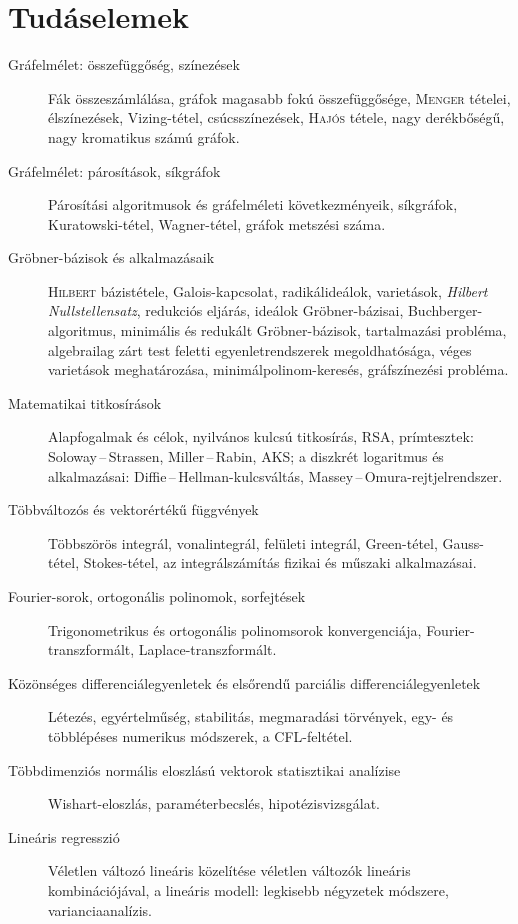 \documentclass[DIV=15,appendixprefix]{scrreprt}
\theoremstyle{definition}
\theoremstyle{remark}
\begin{document}
\chapter{Tudáselemek}
%
\begin{description}
	\item[Gráfelmélet: összefüggőség, színezések] Fák összeszámlálása, gráfok magasabb fokú
	összefüggősége, \textsc{Menger} tételei, élszínezések, Vizing-tétel, csúcsszínezések,
	\textsc{Hajós} tétele, nagy derékbőségű, nagy kromatikus számú gráfok.
%
	\item[Gráfelmélet: párosítások, síkgráfok] Párosítási algoritmusok és gráfelméleti
	következményeik, síkgráfok, Kuratowski-tétel, Wagner-tétel, gráfok metszési száma.
%
	\item[Gröbner-bázisok és alkalmazásaik] \textsc{Hilbert} bázistétele, Galois-kapcsolat,
	radikálideálok, varietások, \emph{Hilbert Nullstellensatz}, redukciós eljárás, ideálok
	Gröbner-bázisai, Buchberger-algoritmus, minimális és redukált Gröbner-bázisok, tartalmazási
	probléma, algebrailag zárt test feletti egyenletrendszerek megoldhatósága, véges varietások
	meghatározása, minimálpolinom-keresés, gráfszínezési probléma.
%
	\item[Matematikai titkosírások] Alapfogalmak és célok, nyilvános kulcsú titkosírás, RSA,
	prímtesztek: Soloway\,--\,Strassen, Miller\,--\,Rabin, AKS; a diszkrét logaritmus és
	alkalmazásai: Diffie\,--\,Hellman-kulcsváltás, Massey\,--\,Omura-rejtjelrendszer.
%
	\item[Többváltozós és vektorértékű függvények] Többszörös integrál, vonalintegrál, felületi
	integrál, Green-tétel, Gauss-tétel, Stokes-tétel, az integrálszámítás fizikai és műszaki
	alkalmazásai.
%
	\item[Fourier-sorok, ortogonális polinomok, sorfejtések] Trigonometrikus és ortogonális
	polinomsorok konvergenciája, Fourier-transzformált, Laplace-transzformált.
%
	\item[Közönséges differenciálegyenletek és elsőrendű parciális differenciálegyenletek] Létezés,
	egyértelműség, stabilitás, megmaradási törvények, egy- és többlépéses numerikus módszerek, a
	CFL-feltétel.
%
	\item[Többdimenziós normális eloszlású vektorok statisztikai analízise] Wishart-eloszlás,
	pa\-ra\-mé\-ter\-becs\-lés, hipotézisvizsgálat.
%
	\item[Lineáris regresszió] Véletlen változó lineáris közelítése véletlen változók lineáris
	kombinációjával, a lineáris modell: legkisebb négyzetek módszere, varianciaanalízis.

\end{description}
\end{document}
